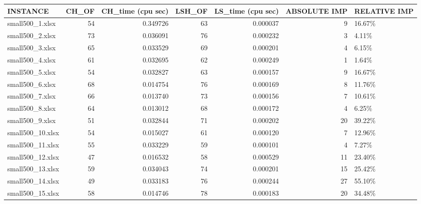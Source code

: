 \documentclass[11pt, a4paper]{article}
\begin{document}
\begin{table}[h!]
\centering
\begin{adjustbox}{max width=\textwidth}
\begin{tabular}{lrrrrrl}
	\toprule
			 INSTANCE &  CH\_OF &  CH\_time (cpu sec) &  LSH\_OF &  LS\_time (cpu sec) &  ABSOLUTE IMP & RELATIVE IMP \\
	\midrule
	  small500\_1.xlsx &     54 &           0.349726 &      63 &           0.000037 &             9 &       16.67\% \\
	  small500\_2.xlsx &     73 &           0.036091 &      76 &           0.000232 &             3 &        4.11\% \\
	  small500\_3.xlsx &     65 &           0.033529 &      69 &           0.000201 &             4 &        6.15\% \\
	  small500\_4.xlsx &     61 &           0.032695 &      62 &           0.000249 &             1 &        1.64\% \\
	  small500\_5.xlsx &     54 &           0.032827 &      63 &           0.000157 &             9 &       16.67\% \\
	  small500\_6.xlsx &     68 &           0.014754 &      76 &           0.000169 &             8 &       11.76\% \\
	  small500\_7.xlsx &     66 &           0.013740 &      73 &           0.000156 &             7 &       10.61\% \\
	  small500\_8.xlsx &     64 &           0.013012 &      68 &           0.000172 &             4 &        6.25\% \\
	  small500\_9.xlsx &     51 &           0.032844 &      71 &           0.000202 &            20 &       39.22\% \\
	 small500\_10.xlsx &     54 &           0.015027 &      61 &           0.000120 &             7 &       12.96\% \\
	 small500\_11.xlsx &     55 &           0.033229 &      59 &           0.000101 &             4 &        7.27\% \\
	 small500\_12.xlsx &     47 &           0.016532 &      58 &           0.000529 &            11 &       23.40\% \\
	 small500\_13.xlsx &     59 &           0.034043 &      74 &           0.000201 &            15 &       25.42\% \\
	 small500\_14.xlsx &     49 &           0.033183 &      76 &           0.000244 &            27 &       55.10\% \\
	 small500\_15.xlsx &     58 &           0.014746 &      78 &           0.000183 &            20 &       34.48\% \\

\end{tabular}
\end{adjustbox}
\end{table}
\end{document}
